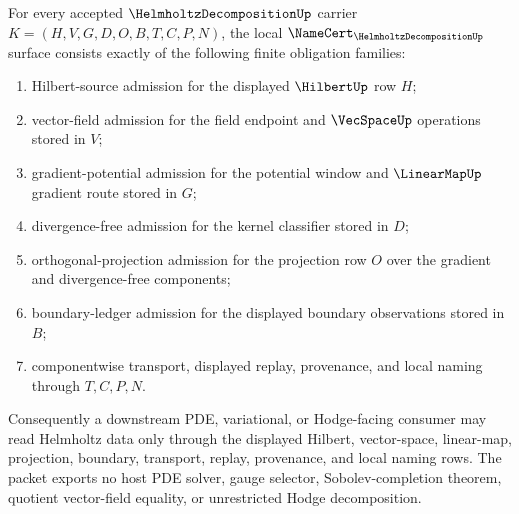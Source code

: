 \begin{theorem}
\label{thm:helmholtz-decomposition-namecert-obligations}
For every accepted $\HelmholtzDecompositionUp$ carrier $K=(H,V,G,D,O,B,T,C,P,N)$, the local $\NameCert_{\HelmholtzDecompositionUp}$ surface consists exactly of the following finite obligation families:
\begin{enumerate}
\item Hilbert-source admission for the displayed $\HilbertUp$ row $H$;
\item vector-field admission for the field endpoint and $\VecSpaceUp$ operations stored in $V$;
\item gradient-potential admission for the potential window and $\LinearMapUp$ gradient route stored in $G$;
\item divergence-free admission for the kernel classifier stored in $D$;
\item orthogonal-projection admission for the projection row $O$ over the gradient and divergence-free components;
\item boundary-ledger admission for the displayed boundary observations stored in $B$;
\item componentwise transport, displayed replay, provenance, and local naming through $T,C,P,N$.
\end{enumerate}
Consequently a downstream PDE, variational, or Hodge-facing consumer may read Helmholtz data only through the displayed Hilbert, vector-space, linear-map, projection, boundary, transport, replay, provenance, and local naming rows. The packet exports no host PDE solver, gauge selector, Sobolev-completion theorem, quotient vector-field equality, or unrestricted Hodge decomposition.
\end{theorem}
